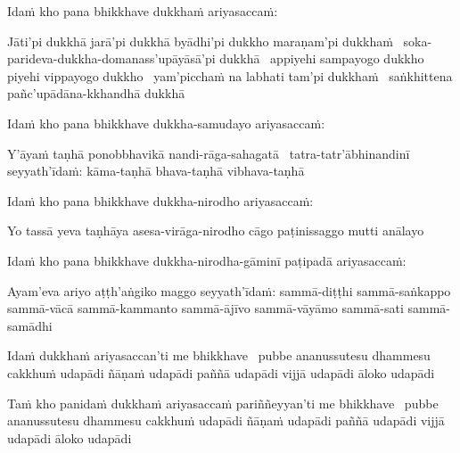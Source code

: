 \begin{pali-hang}
  Idaṁ kho pana bhikkhave dukkhaṁ ariyasaccaṁ:
\end{pali-hang}

\begin{pali-hang}
  Jāti'pi dukkhā jarā'pi dukkhā byādhi'pi dukkho maraṇam'pi dukkhaṁ \breathmark\ soka-parideva-dukkha-domanass'upāyāsā'pi dukkhā \breathmark\ appiyehi sampayogo dukkho piyehi vippayogo dukkho \breathmark\ yam'picchaṁ na labhati tam'pi dukkhaṁ \breathmark\ saṅkhittena pañc'upādāna-kkhandhā dukkhā
\end{pali-hang}

\begin{pali-hang}
  Idaṁ kho pana bhikkhave dukkha-samudayo ariyasaccaṁ:
\end{pali-hang}

\begin{pali-hang}
  Y'āyaṁ taṇhā ponobbhavikā nandi-rāga-sahagatā \breathmark\ tatra-tatr'ābhinandinī seyyath'īdaṁ: kāma-taṇhā bhava-taṇhā vibhava-taṇhā
\end{pali-hang}

\begin{pali-hang}
  Idaṁ kho pana bhikkhave dukkha-nirodho ariyasaccaṁ:
\end{pali-hang}

\begin{pali-hang}
  Yo tassā yeva taṇhāya asesa-virāga-nirodho cāgo paṭinissaggo mutti anālayo
\end{pali-hang}

\begin{pali-hang}
  Idaṁ kho pana bhikkhave dukkha-nirodha-gāminī paṭipadā ariyasaccaṁ:
\end{pali-hang}

\begin{pali-hang}
  Ayam'eva ariyo aṭṭh'aṅgiko maggo seyyath'īdaṁ: sammā-diṭṭhi sammā-saṅkappo sammā-vācā sammā-kammanto sammā-ājīvo sammā-vāyāmo sammā-sati sammā-samādhi
\end{pali-hang}

\begin{pali-hang}
  Idaṁ dukkhaṁ ariyasaccan'ti me bhikkhave \breathmark\ pubbe ananussutesu dhammesu cakkhuṁ udapādi ñāṇaṁ udapādi paññā udapādi vijjā udapādi āloko udapādi
\end{pali-hang}

\begin{pali-hang}
  Taṁ kho panidaṁ dukkhaṁ ariyasaccaṁ pariññeyyan'ti me bhikkhave \breathmark\ pubbe ananussutesu dhammesu cakkhuṁ udapādi ñāṇaṁ udapādi paññā udapādi vijjā udapādi āloko udapādi
\end{pali-hang}


